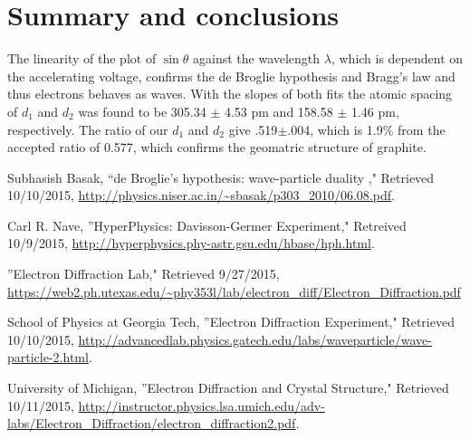 \documentclass[11pt,letterpaper,onecolumn]{article}
\begin{document}
%
%


\section{Summary and conclusions}

The linearity of the plot of $\sin{\theta}$ against the wavelength $\lambda$, which is dependent on the accelerating voltage, confirms the de Broglie hypothesis and Bragg's law and thus electrons behaves as waves. With the slopes of both fits the atomic spacing of $d_1$ and $d_2$ was found to be 305.34 $\pm$ 4.53 pm and 158.58 $\pm$ 1.46 pm, respectively. The ratio of our $d_1$ and $d_2$ give .519$\pm$.004, which is 1.9$\%$ from the accepted ratio of 0.577, which confirms the geomatric structure of graphite.


\begin{thebibliography}{9}

Subhasish Basak, ``de Broglie’s hypothesis: wave-particle duality
," Retrieved 10/10/2015, \url{http://physics.niser.ac.in/~sbasak/p303_2010/06.08.pdf}. 

Carl R. Nave, ''HyperPhysics: Davisson-Germer Experiment," Retreived 10/9/2015, \url{http://hyperphysics.phy-astr.gsu.edu/hbase/hph.html}.

 ''Electron Diffraction Lab," Retrieved 9/27/2015, \url{https://web2.ph.utexas.edu/~phy353l/lab/electron_diff/Electron_Diffraction.pdf}

School of Physics at Georgia Tech, ''Electron Diffraction Experiment," Retrieved 10/10/2015, \url{http://advancedlab.physics.gatech.edu/labs/waveparticle/wave-particle-2.html}.

University of Michigan, ''Electron Diffraction and Crystal Structure," Retrieved 10/11/2015, \url{http://instructor.physics.lsa.umich.edu/adv-labs/Electron_Diffraction/electron_diffraction2.pdf}.

\end{thebibliography}

\end{document}
